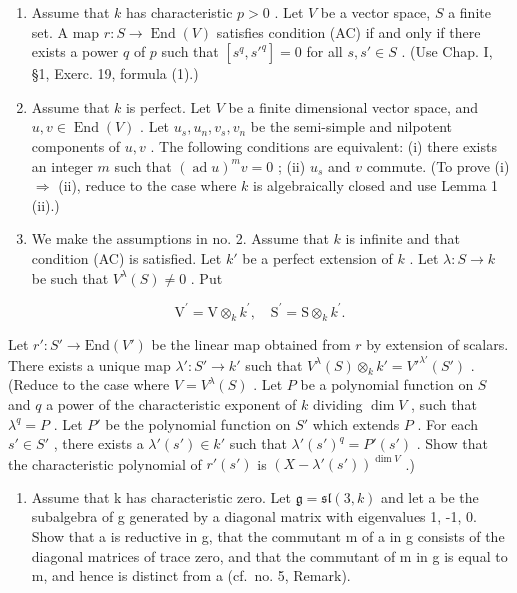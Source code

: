 
\begin{enumerate}
\def\labelenumi{\arabic{enumi})}
\item
  Assume that \(k\) has characteristic \(p > 0\) . Let \(V\) be a vector space, \(S\) a finite set. A map \(r: S \to \operatorname{End}(V)\) satisfies condition (AC) if and only if there exists a power \(q\) of \(p\) such that \([s^q, s'^q] = 0\) for all \(s, s' \in S\) . (Use Chap. I, §1, Exerc. 19, formula (1).)
\item
  Assume that \(k\) is perfect. Let \(V\) be a finite dimensional vector space, and \(u, v \in \operatorname{End}(V)\) . Let \(u_s, u_n, v_s, v_n\) be the semi-simple and nilpotent components of \(u, v\) . The following conditions are equivalent: (i) there exists an integer \(m\) such that \((\operatorname{ad} u)^m v = 0\) ; (ii) \(u_s\) and \(v\) commute. (To prove (i) \(\Longrightarrow\) (ii), reduce to the case where \(k\) is algebraically closed and use Lemma 1 (ii).)
\item
  We make the assumptions in no. 2. Assume that \(k\) is infinite and that condition (AC) is satisfied. Let \(k'\) be a perfect extension of \(k\) . Let \(\lambda : S \to k\) be such that \(V^{\lambda}(S) \neq 0\) . Put
\end{enumerate}

\[
\mathrm{V} ^ {\prime} = \mathrm{V} \otimes_ {k} k ^ {\prime}, \quad \mathrm{S} ^ {\prime} = \mathrm{S} \otimes_ {k} k ^ {\prime}.
\]

Let \(r' : S' \to \text{End}(V')\) be the linear map obtained from \(r\) by extension of scalars. There exists a unique map \(\lambda' : S' \to k'\) such that \(V^{\lambda}(S) \otimes_k k' = V'^{\lambda'}(S')\) . (Reduce to the case where \(V = V^{\lambda}(S)\) . Let \(P\) be a polynomial function on \(S\) and \(q\) a power of the characteristic exponent of \(k\) dividing \(\dim V\) , such that \(\lambda^q = P\) . Let \(P'\) be the polynomial function on \(S'\) which extends \(P\) . For each \(s' \in S'\) , there exists a \(\lambda'(s') \in k'\) such that \(\lambda'(s')^q = P'(s')\) . Show that the characteristic polynomial of \(r'(s')\) is \((X - \lambda'(s'))^{\dim V}\) .)

\begin{enumerate}
\def\labelenumi{\arabic{enumi})}
\setcounter{enumi}{3}
\tightlist
\item
  Assume that k has characteristic zero. Let \(\mathfrak{g} = \mathfrak{sl}(3, k)\) and let a be the subalgebra of g generated by a diagonal matrix with eigenvalues 1, -1, 0. Show that a is reductive in g, that the commutant m of a in g consists of the diagonal matrices of trace zero, and that the commutant of m in g is equal to m, and hence is distinct from a (cf.~no. 5, Remark).
\end{enumerate}

